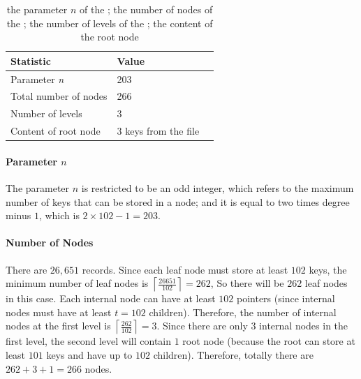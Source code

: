 \begin{table}[h] 
    \hfill
    \begin{minipage}{.99\textwidth}
        \centering
        \renewcommand{\arraystretch}{1.2}
        \begin{tabular}{@{}lll@{}}
        \toprule
        Statistic                   & Value       \\
        \midrule
        \multirow{1}{*}{Parameter \textit{n}}& 203 \\

        \midrule
        \multirow{1}{*}{Total number of nodes} & 266  \\
  
        \midrule
        \multirow{1}{*}{Number of levels} & 3 \\

        \midrule
        \multirow{1}{*}{Content of root node} & 3 keys from the file \\

        \bottomrule
        \end{tabular}
        \vspace{5mm}
        \caption{the parameter $n$ of the \bplustree; the
number of nodes of the \bplustree; the number of levels of the \bplustree; the content of the root node}
    \end{minipage}
\end{table}

\paragraph{Parameter $n$} The parameter $n$ is restricted to be an odd integer, which refers to the maximum number of keys that can be stored in a node; and it is equal to two times degree minus $1$, which is $2\times 102-1=203$. 

\paragraph{Number of Nodes} There are $26,651$ records. Since each leaf node must store at least $102$ keys, the minimum number of leaf nodes is $\left\lceil\frac{26651}{102}\right\rceil = 262$, So there will be $262$ leaf nodes in this case. Each internal node can have at least $102$ pointers (since internal nodes must have at least 
$t=102$ children). Therefore, the number of internal nodes at the first level is $\left\lceil \frac{262}{102} \right\rceil = 3$. Since there are only $3$ internal nodes in the first level, the second level will contain $1$ root node (because the root can store at least $101$ keys and have up to $102$ children). Therefore, totally there are $262 + 3 + 1 = 266$ nodes.

